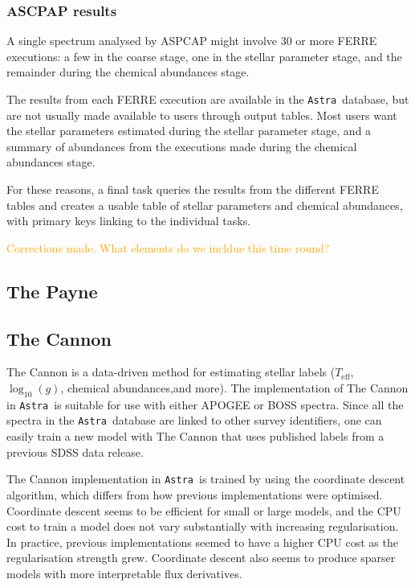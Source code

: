 \documentclass[modern]{aastex631}
\newcommand{\astra}{\texttt{Astra}}
\newcommand{\Astra}{\astra}
\newcommand{\todo}[1]{\textcolor{orange}{#1}}
\newcommand{\teff}{T_\mathrm{eff}}
\newcommand{\logg}{\log_{10}(g)}
\begin{document}
\subsubsection{ASCPAP results}

A single spectrum analysed by ASPCAP might involve 30 or more FERRE executions: a few in the coarse stage, one in the stellar parameter stage, and the remainder during the chemical abundances stage.

The results from each FERRE execution are available in the \Astra\ database, but are not usually made available to users through output tables. Most users want the stellar parameters estimated during the stellar parameter stage, and a summary of abundances from the executions made during the chemical abundances stage.

For these reasons, a final task queries the results from the different FERRE tables and creates a usable table of stellar parameters and chemical abundances, with primary keys linking to the individual tasks. 

\todo{Corrections made. What elements do we incldue this time round?}


\subsection{The Payne} \label{sec:methods-the-payne}

\subsection{The Cannon} \label{sec:methods-the-cannon}

The Cannon \citep{Ness,thecannon} is a data-driven method for estimating stellar labels ($\teff$, $\logg$, chemical abundances,and more). The implementation of The Cannon in \Astra\ is suitable for use with either APOGEE or BOSS spectra. Since all the spectra in the \Astra\ database are linked to other survey identifiers, one can easily train a new model with The Cannon that uses published labels from a previous SDSS data release. 

The Cannon implementation in \Astra\ is trained by using the coordinate descent algorithm, which differs from how previous implementations were optimised. Coordinate descent seems to be efficient for small or large models, and the CPU cost to train a model does not vary substantially with increasing regularisation. In practice, previous implementations seemed to have a higher CPU cost as the regularisation strength grew. Coordinate descent also seems to produce sparser models with more interpretable flux derivatives.
\end{document}
